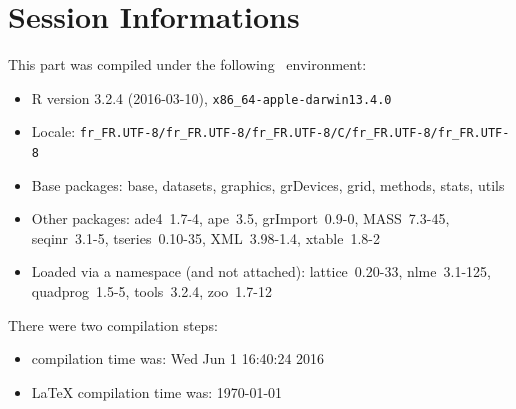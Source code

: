 \documentclass{article}
\begin{document}
%






\section*{Session Informations}

\begin{scriptsize}

This part was compiled under the following \Rlogo{}~environment:

\begin{itemize}\raggedright
  \item R version 3.2.4 (2016-03-10), \verb|x86_64-apple-darwin13.4.0|
  \item Locale: \verb|fr_FR.UTF-8/fr_FR.UTF-8/fr_FR.UTF-8/C/fr_FR.UTF-8/fr_FR.UTF-8|
  \item Base packages: base, datasets, graphics, grDevices, grid,
    methods, stats, utils
  \item Other packages: ade4~1.7-4, ape~3.5, grImport~0.9-0,
    MASS~7.3-45, seqinr~3.1-5, tseries~0.10-35, XML~3.98-1.4,
    xtable~1.8-2
  \item Loaded via a namespace (and not attached): lattice~0.20-33,
    nlme~3.1-125, quadprog~1.5-5, tools~3.2.4, zoo~1.7-12
\end{itemize}
There were two compilation steps:

\begin{itemize}
  \item \Rlogo{} compilation time was: Wed Jun  1 16:40:24 2016
  \item \LaTeX{} compilation time was: \today
\end{itemize}

\end{scriptsize}


\clearpage
{}


\end{document}
